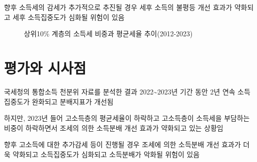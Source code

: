 \documentclass[
  a4paper,
  oneside,
  open=any]{scrbook}
\begin{document}
향후 소득세의 감세가 추가적으로 추진될 경우 세후 소득의 불평등 개선
효과가 약화되고 세후 소득집중도가 심화될 위험이 있음

\begin{figure}

\caption{\label{fig-cons_tax}상위10\% 계층의 소득세 비중과 평균세율
추이(2012-2023)}


\end{figure}%

\section{}\label{section}

\section{평가와 시사점}\label{uxd3c9uxac00uxc640-uxc2dcuxc0acuxc810}

국세청의 통합소득 천분위 자료를 분석한 결과 2022\textasciitilde2023년
기간 동안 2년 연속 소득집중도가 완화되고 분배지표가 개선됨

하지만, 2023년 들어 고소득층의 평균세율이 하락하고 고소득층이 소득세을
부담하는 비중이 하락하면서 조세의 의한 소득분배 개선 효과가 약화되고
있는 상황임

향후 고소득에 대한 추가감세 등이 진행될 경우 조세에 의한 소득분배 개선
효과가 더욱 약화되고 소득집중도가 심화되고 소득분배가 악화될 위험이 있음
\end{document}

